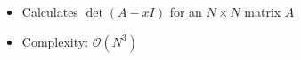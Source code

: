 \begin{itemize}
  \item Calculates $\det(A-xI)$ for an $N\times N$ matrix $A$
  \item Complexity: $\mathcal{O}(N^3)$
\end{itemize}